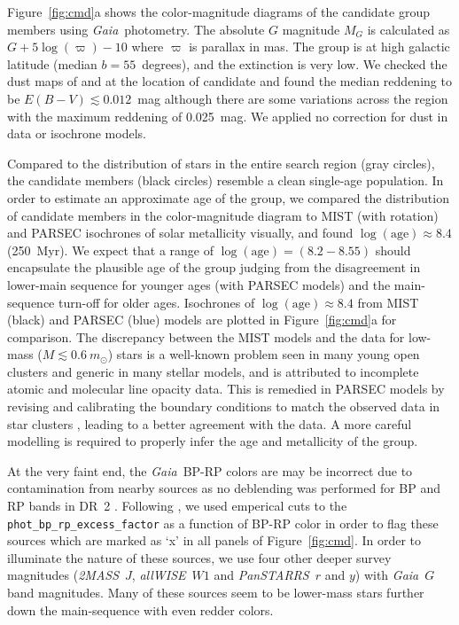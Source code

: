 \documentclass[modern,letterpaper]{aastex61}
\newcommand{\project}[1]{\textsl{#1}}
\newcommand{\acronym}[1]{{\small{#1}}}
\newcommand{\gaia}{\project{Gaia}}
\newcommand{\tmass}{\project{\acronym{2MASS}}}
\newcommand{\allwise}{\project{\acronym{allWISE}}}
\newcommand{\panstarrs}{\project{\acronym{PanSTARRS}}}
\newcommand{\figname}{Figure}
\begin{document}
Figure~\ref{fig:cmd}a shows the color-magnitude diagrams
of the candidate group members using \gaia\ photometry.
The absolute $G$ magnitude $M_G$ is calculated as $G + 5\log(\varpi) -10$ where
$\varpi$ is parallax in mas.
The group is at high galactic latitude (median $b=55$~degrees),
and the extinction is very low.
We checked the dust maps of \citet{1998ApJ...500..525S} and
\citet{2017ApJ...846...38L}
at the location of candidate and found the median reddening to be
$E(B-V)\lesssim 0.012$~mag although there are some variations across the region with
the maximum reddening of 0.025~mag.
We applied no correction for dust in data or isochrone models.

Compared to the distribution of stars in the entire search region (gray circles),
the candidate members (black circles) resemble a clean single-age population.
In order to estimate an approximate age of the group,
we compared the distribution of candidate members in the color-magnitude diagram
to MIST \citep{2016ApJ...823..102C} (with rotation) and
PARSEC isochrones \citep[v1.2S;][]{2012MNRAS.427..127B,2015MNRAS.452.1068C}
of solar metallicity visually,
and found $\log(\mathrm{age}) \approx 8.4$ (250~Myr).
We expect that a range of $\log(\mathrm{age}) = (8.2-8.55)$ should encapsulate
the plausible age of the group judging from the disagreement in lower-main
sequence for younger ages (with PARSEC models) and
the main-sequence turn-off for older ages.
Isochrones of $\log(\mathrm{age}) \approx 8.4$
from MIST (black) and PARSEC (blue) models are plotted in \figname~\ref{fig:cmd}a
for comparison.
The discrepancy between the MIST models and the data for low-mass
($M\lesssim0.6~m_\odot$) stars is a well-known problem seen in many young open
clusters and generic in many stellar models, and is attributed to incomplete
atomic and molecular line opacity data.
This is remedied in PARSEC models by revising and calibrating the boundary conditions
to match the observed data in star clusters \citep{2014MNRAS.444.2525C}, leading to
a better agreement with the data.
A more careful modelling is required to properly infer the age and metallicity
of the group.

At the very faint end, the \gaia\ BP-RP colors are may be incorrect due to
contamination from nearby sources as no deblending was performed for BP and RP
bands in DR~2 \citep{2018arXiv180409368E}.
Following \citet{2018arXiv180409378G}, we used emperical cuts to the
\texttt{phot\_bp\_rp\_excess\_factor} as a function of BP-RP color in order to
flag these sources which are marked as `x' in all panels of
Figure~\ref{fig:cmd}.
In order to illuminate the nature of these sources, we use four other deeper
survey magnitudes (\tmass\ $J$, \allwise\ $W1$ and \panstarrs\ $r$ and $y$) with
\gaia\ $G$ band magnitudes.
%
Many of these sources seem to be lower-mass stars further down the main-sequence
with even redder colors.
\end{document}
